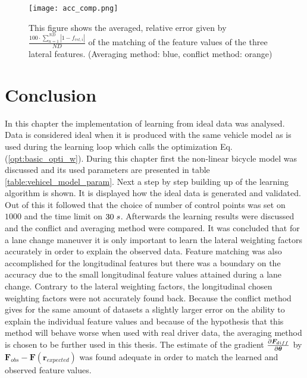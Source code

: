 \begin{figure}[h!]
	\centering
	\texttt{[image: acc\_comp.png]}
	\caption{This figure shows the averaged, relative error given by $\frac{100\cdot\sum_{n=1}^{ND}|1-f_{rel,i}|}{ND}$ of the matching of the feature values of the three lateral features. (Averaging method: blue, conflict method: orange)}
	\label{fig:acc_comp}
\end{figure}

\newpage
 \section{Conclusion} \label{s:conclusion_cha4}
In this chapter the implementation of learning from ideal data was analysed. Data is considered ideal when it is produced with the same vehicle model as is used during the learning loop which calls the optimization Eq. (\ref{opt:basic_opti_w}). During this chapter first the non-linear bicycle model was discussed and its used parameters are presented in table \ref{table:vehicel_model_param}. Next a step by step building up of the learning algorithm is shown. It is displayed how the ideal data is generated and validated. Out of this it followed that the choice of number of control points was set on $1000$ and the time limit on $30 \hspace{1mm}s$. Afterwards the learning results were discussed and the conflict and averaging method were compared. It was concluded that for a lane change maneuver it is only important to learn the lateral weighting factors accurately in order to explain the observed data. Feature matching was also accomplished for the longitudinal features but there was a boundary on the accuracy due to the small longitudinal feature values attained during a lane change. Contrary to the lateral weighting factors, the longitudinal chosen weighting factors were not accurately found back. Because the conflict method gives for the same amount of datasets a slightly larger error on the ability to explain the individual feature values and because of the hypothesis that this method will behave worse when used with real driver data, the averaging method is chosen to be further used in this thesis. The estimate of the gradient $\pdv{\bm{F}_{diff}}{\bm{\theta}}$ by $\bm{F}_{obs} - \bm{F}(\bm{r}_{expected})$ was found adequate in order to match the learned and observed feature values.



